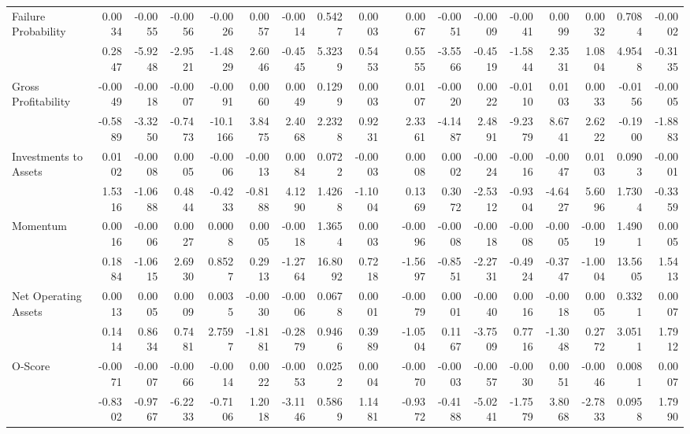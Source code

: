 \begin{table}[htbp]
{\begin{tabular}{lrrrrrrrrrrrrrrrrr}
      Failure Probability & 0.0034 & -0.0055 & -0.0056 & -0.0026 & 0.0057 & -0.0014 & 0.5427 & 0.0003 &       & 0.0067 & -0.0051 & -0.0009 & -0.0041 & 0.0099 & 0.0032 & 0.7084 & -0.0002 \\
            & 0.2847 & -5.9248 & -2.9521 & -1.4829 & 2.6046 & -0.4545 & 5.3239 & 0.5453 &       & 0.5555 & -3.5566 & -0.4519 & -1.5844 & 2.3531 & 1.0804 & 4.9548 & -0.3135 \\
      Gross Profitability & -0.0049 & -0.0018 & -0.0007 & -0.0091 & 0.0060 & 0.0049 & 0.1299 & 0.0003 &       & 0.0107 & -0.0020 & 0.0022 & -0.0110 & 0.0103 & 0.0033 & -0.0156 & -0.0005 \\
            & -0.5889 & -3.3250 & -0.7473 & -10.1166 & 3.8475 & 2.4068 & 2.2328 & 0.9231 &       & 2.3361 & -4.1487 & 2.4891 & -9.2379 & 8.6741 & 2.6222 & -0.1900 & -1.8883 \\
      Investments to Assets & 0.0102 & -0.0008 & 0.0005 & -0.0006 & -0.0013 & 0.0084 & 0.0722 & -0.0003 &       & 0.0008 & 0.0002 & -0.0024 & -0.0016 & -0.0047 & 0.0103 & 0.0903 & -0.0001 \\
            & 1.5316 & -1.0688 & 0.4844 & -0.4233 & -0.8188 & 4.1290 & 1.4268 & -1.1004 &       & 0.1369 & 0.3072 & -2.5312 & -0.9304 & -4.6427 & 5.6096 & 1.7304 & -0.3359 \\
      Momentum & 0.0016 & -0.0006 & 0.0027 & 0.0008 & 0.0005 & -0.0018 & 1.3654 & 0.0003 &       & -0.0096 & -0.0008 & -0.0018 & -0.0008 & -0.0005 & -0.0019 & 1.4901 & 0.0005 \\
            & 0.1884 & -1.0615 & 2.6930 & 0.8527 & 0.2913 & -1.2764 & 16.8092 & 0.7218 &       & -1.5697 & -0.8551 & -2.2731 & -0.4924 & -0.3747 & -1.0004 & 13.5605 & 1.5413 \\
      Net Operating Assets & 0.0013 & 0.0005 & 0.0009 & 0.0035 & -0.0030 & -0.0006 & 0.0678 & 0.0001 &       & -0.0079 & 0.0001 & -0.0040 & 0.0016 & -0.0018 & 0.0005 & 0.3321 & 0.0007 \\
            & 0.1414 & 0.8634 & 0.7481 & 2.7597 & -1.8181 & -0.2879 & 0.9466 & 0.3989 &       & -1.0504 & 0.1167 & -3.7509 & 0.7716 & -1.3048 & 0.2772 & 3.0511 & 1.7912 \\
      O-Score & -0.0071 & -0.0007 & -0.0066 & -0.0014 & 0.0022 & -0.0053 & 0.0252 & 0.0004 &       & -0.0070 & -0.0003 & -0.0057 & -0.0030 & 0.0051 & -0.0046 & 0.0081 & 0.0007 \\
            & -0.8302 & -0.9767 & -6.2233 & -0.7106 & 1.2018 & -3.1146 & 0.5869 & 1.1481 &       & -0.9372 & -0.4188 & -5.0241 & -1.7579 & 3.8068 & -2.7833 & 0.0958 & 1.7990 \\

\end{tabular}}
\end{table}
